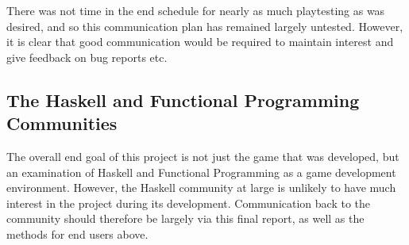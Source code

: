 There was not time in the end schedule for nearly as much playtesting as was desired, and so this communication plan has remained largely untested. However, it is clear that good communication would be required to maintain interest and give feedback on bug reports etc.

\subsection{The Haskell and Functional Programming Communities}

The overall end goal of this project is not just the game that was developed, but an examination
of Haskell and Functional Programming as a game development environment. However, the Haskell community at
large is unlikely to have much interest in the project during its development. Communication
back to the community should therefore be largely via this final report, as well as the
methods for end users above.
